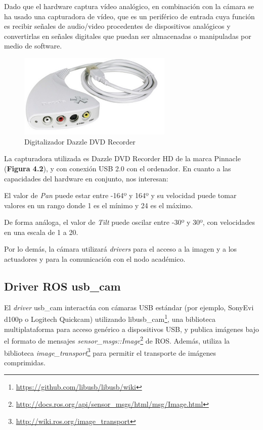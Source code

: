 \begin{multicols}{2}
Dado que el hardware captura vídeo analógico, en combinación con la cámara se ha usado una capturadora de vídeo, que es un periférico de entrada cuya función es recibir señales de audio/video procedentes de dispositivos analógicos y convertirlas en señales digitales que puedan ser almacenadas o manipuladas por medio de software.
\begin{figure}[H]
  \begin{center}
    \includegraphics[width=0.55\linewidth, height=4.0cm]{figures/capturadora.jpg}
		\caption{Digitalizador Dazzle DVD Recorder}
		\label{fig.digitalizadora}
		\end{center}
\end{figure}
\end{multicols}
La capturadora utilizada es Dazzle DVD Recorder HD de la marca Pinnacle (\textbf{Figura 4.2}), y con conexión USB 2.0 con el ordenador. En cuanto a las capacidades del hardware en conjunto, nos interesan:

El valor de \textit{Pan} puede estar entre -164º y 164º y su velocidad puede tomar valores en un rango donde 1 es el mínimo y 24 es el máximo.

De forma análoga, el valor de \textit{Tilt} puede oscilar entre -30º y  30º, con velocidades en una escala de 1 a 20.

Por lo demás, la cámara utilizará \textit{drivers} para el acceso a la imagen y a los actuadores y para la comunicación con el nodo académico.

\subsection{Driver ROS usb\_cam}
El \textit{driver} usb\_cam interactúa con cámaras USB estándar (por ejemplo, SonyEvi d100p o Logitech Quickcam) utilizando libusb\_cam\footnote{\url{https://github.com/libusb/libusb/wiki}}, una biblioteca multiplataforma para acceso genérico a dispositivos USB, y publica imágenes bajo el formato de mensajes \textit{sensor\_msgs::Image}\footnote{\url{http://docs.ros.org/api/sensor\_msgs/html/msg/Image.html}} 
 de ROS. Además, utiliza la biblioteca \textit{image\_transport}\footnote{\url{http://wiki.ros.org/image\_transport}} para permitir el transporte de imágenes comprimidas.

